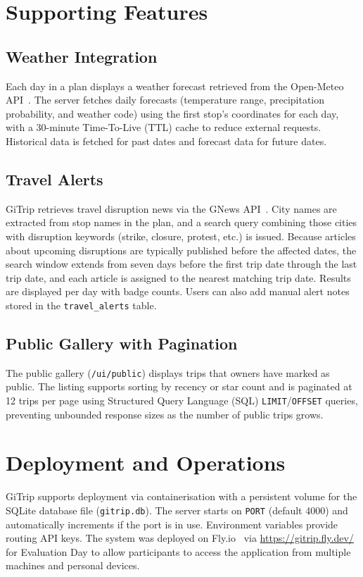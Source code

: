 \section{Supporting Features}
\subsection{Weather Integration}
Each day in a plan displays a weather forecast retrieved from the Open-Meteo
API~\cite{ref_open_meteo}. The server fetches daily forecasts (temperature range, precipitation
probability, and weather code) using the first stop's coordinates for each day,
with a 30-minute Time-To-Live (TTL) cache to reduce external requests. Historical data is
fetched for past dates and forecast data for future dates.

\subsection{Travel Alerts}
GiTrip retrieves travel disruption news via the GNews API~\cite{ref_gnews}. City names are
extracted from stop names in the plan, and a search query combining those
cities with disruption keywords (strike, closure, protest, etc.) is issued.
Because articles about upcoming disruptions are typically published before
the affected dates, the search window extends from seven days before the
first trip date through the last trip date, and each article is assigned to the
nearest matching trip date. Results are displayed per day with badge counts.
Users can also add manual alert notes stored in the \texttt{travel\_alerts}
table.

\subsection{Public Gallery with Pagination}
The public gallery (\texttt{/ui/public}) displays trips that owners have
marked as public. The listing supports sorting by recency or star count and
is paginated at 12 trips per page using Structured Query Language (SQL) \texttt{LIMIT}/\texttt{OFFSET}
queries, preventing unbounded response sizes as the number of public trips
grows.

\section{Deployment and Operations}
GiTrip supports deployment via containerisation with a persistent volume for the
SQLite database file (\texttt{gitrip.db}). The server starts on \texttt{PORT}
(default 4000) and automatically increments if the port is in use. Environment
variables provide routing API keys. The system was deployed on Fly.io~\cite{ref_flyio} via \url{https://gitrip.fly.dev/} for Evaluation Day to
allow participants to access the application from multiple machines and personal
devices.